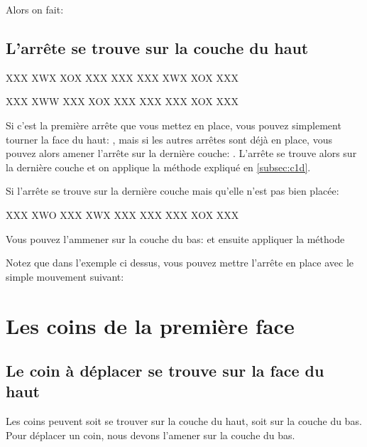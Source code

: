 \documentclass[10pt,paper=a5,pagesize]{scrbook}
\begin{document}
Alors on fait: 

\subsection{L'arrête se trouve sur la couche du haut}

\begin{center}
	\RubikFaceUp%
	{X}{X}{X}%
	{X}{W}{X}%
	{X}{O}{X}
	\RubikFaceRight%
	{X}{X}{X}%
	{X}{X}{X}%
	{X}{X}{X}
	\RubikFaceFront%
	{X}{W}{X}%
	{X}{O}{X}%
	{X}{X}{X}
\end{center}


\begin{center}
	\RubikFaceUp%
	{X}{X}{X}%
	{X}{W}{W}%
	{X}{X}{X}
	\RubikFaceRight%
	{X}{O}{X}%
	{X}{X}{X}%
	{X}{X}{X}
	\RubikFaceFront%
	{X}{X}{X}%
	{X}{O}{X}%
	{X}{X}{X}
\end{center}

Si c'est la première arrête que vous mettez en place, vous pouvez simplement tourner la face du haut: , mais si les autres arrêtes sont déjà en place, vous pouvez alors amener l'arrête sur la dernière couche: . L'arrête se trouve alors sur la dernière couche et on applique la méthode expliqué en \ref{subsec:c1d}.

Si l'arrête se trouve sur la dernière couche mais qu'elle n'est pas bien placée:

\begin{center}
	\RubikFaceUp%
	{X}{X}{X}%
	{X}{W}{O}%
	{X}{X}{X}
	\RubikFaceRight%
	{X}{W}{X}%
	{X}{X}{X}%
	{X}{X}{X}
	\RubikFaceFront%
	{X}{X}{X}%
	{X}{O}{X}%
	{X}{X}{X}
\end{center}

Vous pouvez l'ammener sur la couche du bas:  et ensuite appliquer la méthode

Notez que dans l'exemple ci dessus, vous pouvez mettre l'arrête en place avec le simple mouvement suivant: 

\section{Les coins de la première face}

\subsection{Le coin à déplacer se trouve sur la face du haut}
Les coins peuvent soit se trouver sur la couche du haut, soit sur la couche du bas.
Pour déplacer un coin, nous devons l'amener sur la couche du bas.
\end{document}
